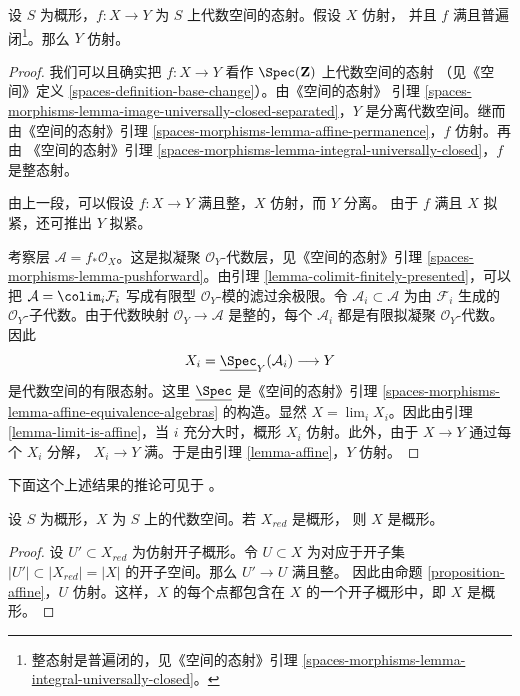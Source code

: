 \begin{proposition}
\label{proposition-affine}
设 $S$ 为概形，$f : X \to Y$ 为 $S$ 上代数空间的态射。假设 $X$ 仿射，
并且 $f$ 满且普遍闭\footnote{整态射是普遍闭的，见《空间的态射》引理
\ref{spaces-morphisms-lemma-integral-universally-closed}。}。那么 $Y$ 仿射。
\end{proposition}

\begin{proof}
我们可以且确实把 $f : X \to Y$ 看作 $\Spec(\mathbf{Z})$ 上代数空间的态射
（见《空间》定义 \ref{spaces-definition-base-change}）。由《空间的态射》
引理 \ref{spaces-morphisms-lemma-image-universally-closed-separated}，$Y$
是分离代数空间。继而由《空间的态射》引理
\ref{spaces-morphisms-lemma-affine-permanence}，$f$ 仿射。再由
《空间的态射》引理
\ref{spaces-morphisms-lemma-integral-universally-closed}，$f$ 是整态射。

\medskip\noindent
由上一段，可以假设 $f : X \to Y$ 满且整，$X$ 仿射，而 $Y$ 分离。
由于 $f$ 满且 $X$ 拟紧，还可推出 $Y$ 拟紧。

\medskip\noindent
考察层 $\mathcal{A} = f_*\mathcal{O}_X$。这是拟凝聚
$\mathcal{O}_Y$-代数层，见《空间的态射》引理
\ref{spaces-morphisms-lemma-pushforward}。由引理
\ref{lemma-colimit-finitely-presented}，可以把
$\mathcal{A} = \colim_i \mathcal{F}_i$ 写成有限型
$\mathcal{O}_Y$-模的滤过余极限。令
$\mathcal{A}_i \subset \mathcal{A}$ 为由 $\mathcal{F}_i$ 生成的
$\mathcal{O}_Y$-子代数。由于代数映射
$\mathcal{O}_Y \to \mathcal{A}$ 是整的，每个 $\mathcal{A}_i$ 都是有限拟凝聚
$\mathcal{O}_Y$-代数。因此
$$
X_i = \underline{\Spec}_Y(\mathcal{A}_i) \longrightarrow Y
$$
是代数空间的有限态射。这里 $\underline{\Spec}$ 是《空间的态射》引理
\ref{spaces-morphisms-lemma-affine-equivalence-algebras} 的构造。显然
$X = \lim_i X_i$。因此由引理 \ref{lemma-limit-is-affine}，当 $i$
充分大时，概形 $X_i$ 仿射。此外，由于 $X \to Y$ 通过每个 $X_i$ 分解，
$X_i \to Y$ 满。于是由引理 \ref{lemma-affine}，$Y$ 仿射。
\end{proof}

\noindent
下面这个上述结果的推论可见于 \cite{CLO}。

\begin{lemma}
\label{lemma-reduction-scheme}
\begin{reference}
\cite[3.1.12]{CLO}
\end{reference}
设 $S$ 为概形，$X$ 为 $S$ 上的代数空间。若 $X_{red}$ 是概形，
则 $X$ 是概形。
\end{lemma}

\begin{proof}
设 $U' \subset X_{red}$ 为仿射开子概形。令 $U \subset X$ 为对应于开子集
$|U'| \subset |X_{red}| = |X|$ 的开子空间。那么 $U' \to U$ 满且整。
因此由命题 \ref{proposition-affine}，$U$ 仿射。这样，$X$ 的每个点都包含在
$X$ 的一个开子概形中，即 $X$ 是概形。
\end{proof}

